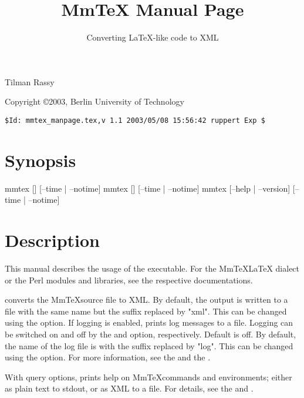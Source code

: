 \documentclass{webpage}
\newcommand{\convertoptions}{\plhld{convert\_options}}
\newcommand{\queryoptions}{\plhld{query\_options}}
\newcommand{\MmTeX}{MmTeX}
\newcommand{\LaTeX}{LaTeX}
\begin{document}
\title{MmTeX Manual Page}
\subtitle{Converting \LaTeX-like code to XML}

Tilman Rassy 

Copyright \copyright 2003, Berlin University of Technology

\verb'$Id: mmtex_manpage.tex,v 1.1 2003/05/08 15:56:42 ruppert Exp $'

\tableofcontents


%


\section[synopsis]{Synopsis}

\begin{preformatted}[code]%
mmtex [\convertoptions] [--time | --notime] 
mmtex [\queryoptions] [--time | --notime]
mmtex [--help | --version] [--time | --notime]
\end{preformatted}


\section{Description}

This manual describes the usage of the  executable. For the \MmTeX \LaTeX
dialect or the Perl modules and libraries, see the respective documentations. 

 converts the \MmTeX source file  to XML. By default, the output is
written to a file with the same name but the suffix replaced by "xml". This can be changed
using the  option. If logging is enabled,  prints log messages to
a file. Logging can be switched on and off by the  and  option,
respectively. Default is off.  By default, the name of the log file is  with the
suffix replaced by "log". This can be changed using the  option. For more
information, see the  and the
.

With query options,  prints help on \MmTeX commands and environments; either as
plain text to stdout, or as XML to a file. For details, see the  and .  
\end{document}

